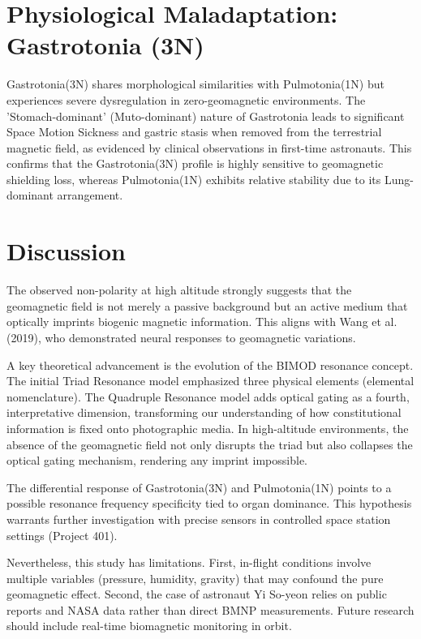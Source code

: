 \documentclass[12pt, a4paper]{article}
\begin{document}
\section{Physiological Maladaptation: Gastrotonia (3N)}
Gastrotonia(3N) shares morphological similarities with Pulmotonia(1N) but experiences severe dysregulation in zero-geomagnetic environments. The 'Stomach-dominant' (Muto-dominant) nature of Gastrotonia leads to significant Space Motion Sickness and gastric stasis when removed from the terrestrial magnetic field, as evidenced by clinical observations in first-time astronauts\cite{NASA_SMS_2021}. This confirms that the Gastrotonia(3N) profile is highly sensitive to geomagnetic shielding loss, whereas Pulmotonia(1N) exhibits relative stability due to its Lung-dominant arrangement.

\section{Discussion}
The observed non-polarity at high altitude strongly suggests that the geomagnetic field is not merely a passive background but an active medium that optically imprints biogenic magnetic information. This aligns with Wang et al. (2019), who demonstrated neural responses to geomagnetic variations.

A key theoretical advancement is the evolution of the BIMOD resonance concept. The initial Triad Resonance model\cite{Yoon_BIMOD_001_v2} emphasized three physical elements (elemental nomenclature). The Quadruple Resonance model\cite{Yoon_BIMOD_001_v3} adds optical gating as a fourth, interpretative dimension, transforming our understanding of how constitutional information is fixed onto photographic media. In high-altitude environments, the absence of the geomagnetic field not only disrupts the triad but also collapses the optical gating mechanism, rendering any imprint impossible.

The differential response of Gastrotonia(3N) and Pulmotonia(1N) points to a possible resonance frequency specificity tied to organ dominance. This hypothesis warrants further investigation with precise sensors in controlled space station settings (Project 401).

Nevertheless, this study has limitations. First, in-flight conditions involve multiple variables (pressure, humidity, gravity) that may confound the pure geomagnetic effect. Second, the case of astronaut Yi So-yeon relies on public reports and NASA data\cite{NASA_SMS_2021} rather than direct BMNP measurements. Future research should include real-time biomagnetic monitoring in orbit.
\end{document}
